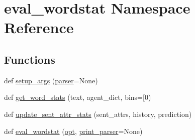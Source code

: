 \hypertarget{namespaceeval__wordstat}{}\section{eval\+\_\+wordstat Namespace Reference}
\label{namespaceeval__wordstat}
\subsection*{Functions}
\begin{DoxyCompactItemize}
\item 
def \hyperlink{namespaceeval__wordstat_a3872be823cf90eb2beb19e7aeb94a898}{setup\+\_\+args} (\hyperlink{namespaceeval__wordstat_a46e86ff5435363475d0171c9bde00fc8}{parser}=None)
\item 
def \hyperlink{namespaceeval__wordstat_a2290cb39c5797675ac4020f96447c1ff}{get\+\_\+word\+\_\+stats} (text, agent\+\_\+dict, bins=\mbox{[}0)
\item 
def \hyperlink{namespaceeval__wordstat_a27c623656f9e3e3f0b0bb6ef04781d9c}{update\+\_\+sent\+\_\+attr\+\_\+stats} (sent\+\_\+attrs, history, prediction)
\item 
def \hyperlink{namespaceeval__wordstat_aeb6ae646e7e2bede292baff78ca1bd83}{eval\+\_\+wordstat} (\hyperlink{namespaceeval__wordstat_a47d20263ebe9cfadbc2d479ba8ac1e25}{opt}, \hyperlink{namespaceeval__wordstat_a1eeded546d4fba5edcd7531fe75b95eb}{print\+\_\+parser}=None)
\end{DoxyCompactItemize}
